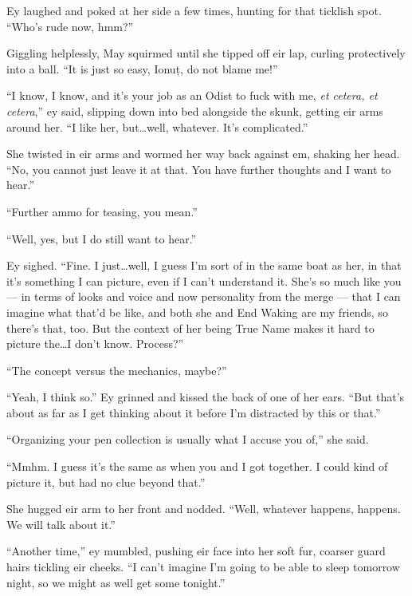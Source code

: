 Ey laughed and poked at her side a few times, hunting for that ticklish spot. ``Who's rude now, hmm?''

Giggling helplessly, May squirmed until she tipped off eir lap, curling protectively into a ball. ``It is just so easy, Ionuț, do not blame me!''

``I know, I know, and it's your job as an Odist to fuck with me, \emph{et cetera, et cetera},'' ey said, slipping down into bed alongside the skunk, getting eir arms around her. ``I like her, but\ldots well, whatever. It's complicated.''

She twisted in eir arms and wormed her way back against em, shaking her head. ``No, you cannot just leave it at that. You have further thoughts and I want to hear.''

``Further ammo for teasing, you mean.''

``Well, yes, but I do still want to hear.''

Ey sighed. ``Fine. I just\ldots well, I guess I'm sort of in the same boat as her, in that it's something I can picture, even if I can't understand it. She's so much like you — in terms of looks and voice and now personality from the merge — that I can imagine what that'd be like, and both she and End Waking are my friends, so there's that, too. But the context of her being True Name makes it hard to picture the\ldots I don't know. Process?''

``The concept versus the mechanics, maybe?''

``Yeah, I think so.'' Ey grinned and kissed the back of one of her ears. ``But that's about as far as I get thinking about it before I'm distracted by this or that.''

``Organizing your pen collection is usually what I accuse you of,'' she said.

``Mmhm. I guess it's the same as when you and I got together. I could kind of picture it, but had no clue beyond that.''

She hugged eir arm to her front and nodded. ``Well, whatever happens, happens. We will talk about it.''

``Another time,'' ey mumbled, pushing eir face into her soft fur, coarser guard hairs tickling eir cheeks. ``I can't imagine I'm going to be able to sleep tomorrow night, so we might as well get some tonight.''
